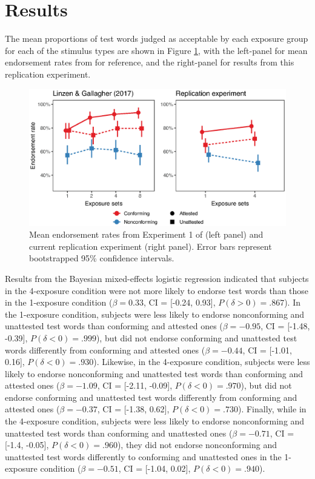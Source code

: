 \documentclass[letterpaper,11pt]{article}
\begin{document}
\section{Results}

The mean proportions of test words judged as acceptable by each exposure group for each of the stimulus types are shown in Figure \ref{fig:end}, with the left-panel for mean endorsement rates from \textcite{linzen2017rapid} for reference, and the right-panel for results from this replication experiment.

\begin{figure}[h]
\center
\includegraphics[scale=0.75]{../analysis/figures/endorsements.eps}
\caption{Mean endorsement rates from Experiment 1 of \textcite{linzen2017rapid} (left panel) and current replication experiment (right panel). Error bars represent bootstrapped 95\% confidence intervals.}
\label{fig:end}
\end{figure}

Results from the Bayesian mixed-effects logistic regression indicated that subjects in the 4-exposure condition were not more likely to endorse test words than those in the 1-exposure condition ($\beta = 0.33$, CI = [-0.24, 0.93], $P(\delta > 0) = .867$).
In the 1-exposure condition, subjects were less likely to endorse nonconforming and unattested test words than conforming and attested ones ($\beta = -0.95$, CI = [-1.48, -0.39], $P(\delta < 0) = .999$), but did not endorse conforming and unattested test words differently from conforming and attested ones ($\beta = -0.44$, CI = [-1.01, 0.16], $P(\delta < 0) = .930$).
Likewise, in the 4-exposure condition, subjects were less likely to endorse nonconforming and unattested test words than conforming and attested ones ($\beta = -1.09$, CI = [-2.11, -0.09], $P(\delta < 0) = .970$), but did not endorse conforming and unattested test words differently from conforming and attested ones ($\beta = -0.37$, CI = [-1.38, 0.62], $P(\delta < 0) = .730$).
Finally, while in the 4-exposure condition, subjects were less likely to endorse nonconforming and unattested test words than conforming and unattested ones ($\beta = -0.71$, CI = [-1.4, -0.05], $P(\delta < 0) = .960$), they did not endorse nonconforming and unattested test words differently to conforming and unattested ones in the 1-exposure condition ($\beta = -0.51$, CI = [-1.04, 0.02], $P(\delta < 0) = .940$).
\end{document}
